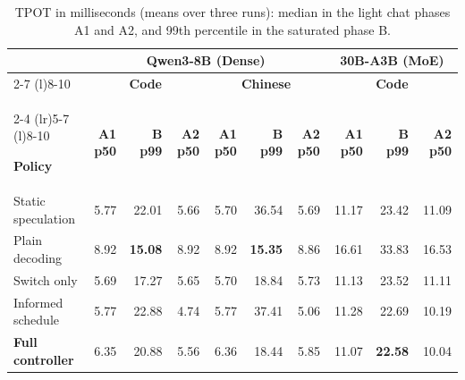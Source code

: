 \documentclass{article}
\begin{document}
\begin{table}[!htbp]
\caption{TPOT in milliseconds (means over three runs): median in the light chat phases A1 and A2, and 99th percentile in the saturated phase B.}
\label{tab:latency}
\centering\small

\begingroup
\renewcommand{\arraystretch}{1.20}
\setlength{\tabcolsep}{3pt}

\begin{tabular}{@{}l*{9}{r}@{}}
\toprule

&
\multicolumn{6}{c}{
  \textbf{Qwen3-8B (Dense)}
}
&
\multicolumn{3}{c}{
  \textbf{30B-A3B (MoE)}
} \\

\cmidrule(lr){2-7}
\cmidrule(l){8-10}

&
\multicolumn{3}{c}{\textbf{Code}}
&
\multicolumn{3}{c}{\textbf{Chinese}}
&
\multicolumn{3}{c}{\textbf{Code}} \\

\cmidrule(lr){2-4}
\cmidrule(lr){5-7}
\cmidrule(l){8-10}

\textbf{Policy}
& \textbf{A1 p50}
& \textbf{B p99}
& \textbf{A2 p50}
& \textbf{A1 p50}
& \textbf{B p99}
& \textbf{A2 p50}
& \textbf{A1 p50}
& \textbf{B p99}
& \textbf{A2 p50} \\

\midrule

Static speculation
& 5.77 & 22.01 & 5.66
& 5.70 & 36.54 & 5.69
& 11.17 & 23.42 & 11.09 \\

Plain decoding
& 8.92
& \cellcolor{tabBest}\textbf{15.08}
& 8.92
& 8.92
& \cellcolor{tabBest}\textbf{15.35}
& 8.86
& 16.61 & 33.83 & 16.53 \\

Switch only
& 5.69 & 17.27 & 5.65
& 5.70 & 18.84 & 5.73
& 11.13 & 23.52 & 11.11 \\

Informed schedule
& 5.77 & 22.88 & 4.74
& 5.77 & 37.41 & 5.06
& 11.28 & 22.69 & 10.19 \\

\addlinespace[3pt]

\rowcolor{tabFull}
\textbf{Full controller}
& 6.35 & 20.88 & 5.56
& 6.36 & 18.44 & 5.85
& 11.07
& \cellcolor{tabBest}\textbf{22.58}
& 10.04 \\

\bottomrule
\end{tabular}
\endgroup

\end{table}
\end{document}
